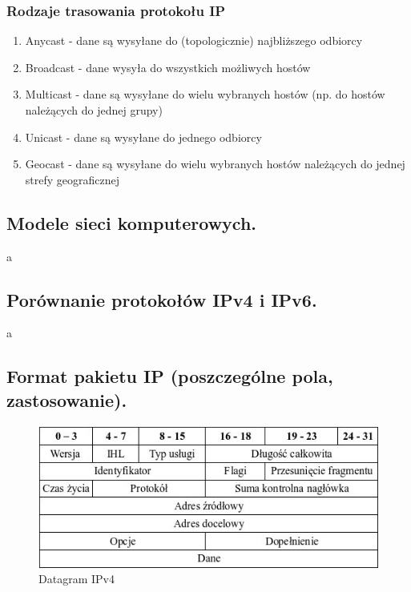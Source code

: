 \documentclass[a4paper,12pt,oneside]{book}
\begin{document}
			\subsubsection{Rodzaje trasowania protokołu IP}
			\begin{enumerate}
				\item Anycast - dane są wysyłane do (topologicznie) najbliższego odbiorcy
				\item Broadcast - dane wysyła do wszystkich możliwych hostów
				\item Multicast - dane są wysyłane do wielu wybranych hostów (np. do hostów należących
				do jednej grupy)
				\item Unicast - dane są wysyłane do jednego odbiorcy
				\item Geocast - dane są wysyłane do wielu wybranych hostów należących do jednej strefy
				geograficznej
			\end{enumerate}
			\newpage\subsection{\color{red}Modele sieci komputerowych.}
				a
			\newpage\subsection{\color{red}Porównanie protokołów IPv4 i IPv6.}
				a
			\newpage\subsection{Format pakietu IP (poszczególne pola, zastosowanie).}
				\begin{figure}[h!]
					\centering\includegraphics[scale=0.65]{ip-datagram.jpg}
					\caption{Datagram IPv4}
				\end{figure}
\end{document}
